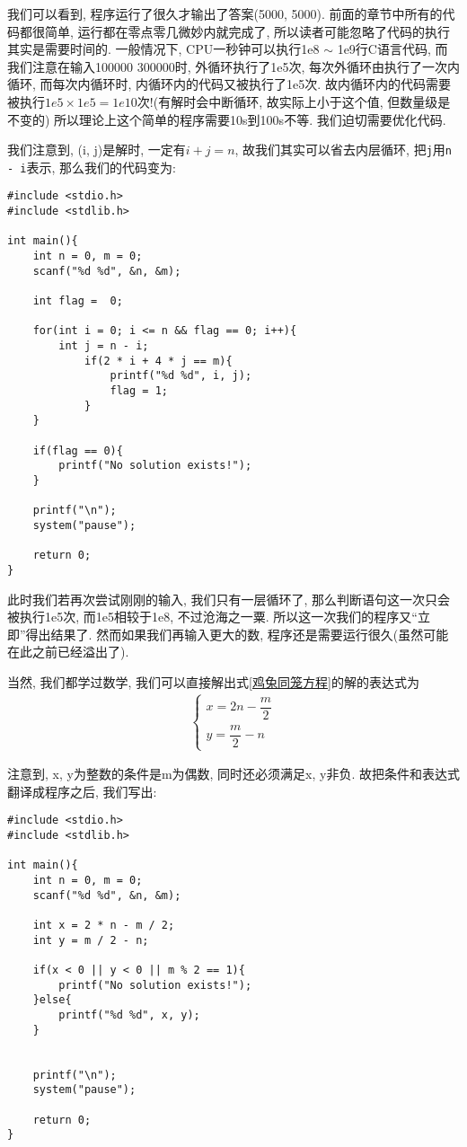         我们可以看到, 程序运行了很久才输出了答案(5000, 5000). 前面的章节中所有的代码都很简单, 运行都在零点零几微妙内就完成了, 所以读者可能忽略了代码的执行其实是需要时间的. 一般情况下, CPU一秒钟可以执行1e8 $\sim$ 1e9行C语言代码, 而我们注意在输入100000 300000时, 外循环执行了1e5次, 每次外循环由执行了一次内循环, 而每次内循环时, 内循环内的代码又被执行了1e5次. 故内循环内的代码需要被执行$1e5 \times 1e5 = 1e10$次!(有解时会中断循环, 故实际上小于这个值, 但数量级是不变的) 所以理论上这个简单的程序需要10s到100s不等. 我们迫切需要优化代码.

        我们注意到, (i, j)是解时, 一定有$i + j = n$, 故我们其实可以省去内层循环, 把\texttt{j}用\texttt{n - i}表示, 那么我们的代码变为:
\begin{lstlisting}
#include <stdio.h>
#include <stdlib.h>

int main(){
    int n = 0, m = 0;
    scanf("%d %d", &n, &m);

    int flag =  0;

    for(int i = 0; i <= n && flag == 0; i++){
        int j = n - i;
            if(2 * i + 4 * j == m){
                printf("%d %d", i, j);
                flag = 1;
            }
    }

    if(flag == 0){
        printf("No solution exists!");
    }

    printf("\n");
    system("pause");

    return 0;
}
\end{lstlisting}

        此时我们若再次尝试刚刚的输入, 我们只有一层循环了, 那么判断语句这一次只会被执行1e5次, 而1e5相较于1e8, 不过沧海之一粟. 所以这一次我们的程序又``立即''得出结果了. 然而如果我们再输入更大的数, 程序还是需要运行很久(虽然可能在此之前已经溢出了).

        当然, 我们都学过数学, 我们可以直接解出式\ref{鸡兔同笼方程}的解的表达式为
        \begin{align}
            \left\{
                \begin{array}{l}
                    x = 2n - \dfrac{m}{2} \\
                    y = \dfrac{m}{2} - n
                \end{array}
            \right. \tag{2}
        \end{align}

        注意到, x, y为整数的条件是m为偶数, 同时还必须满足x, y非负. 故把条件和表达式翻译成程序之后, 我们写出:
\begin{lstlisting}
#include <stdio.h>
#include <stdlib.h>

int main(){
    int n = 0, m = 0;
    scanf("%d %d", &n, &m);

    int x = 2 * n - m / 2;
    int y = m / 2 - n;

    if(x < 0 || y < 0 || m % 2 == 1){
        printf("No solution exists!");
    }else{
        printf("%d %d", x, y);
    }


    printf("\n");
    system("pause");

    return 0;
}
\end{lstlisting}

